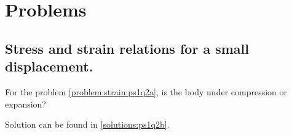 % 
% 
% 
% 
% 
% 
% 
% 
% 
% 
% 
% 
\section{Problems}

\label{problem:strain:ps1q2b}
\subsection{Stress and strain relations for a small displacement.}

For the problem \ref{problem:strain:ps1q2a}, is the body under compression or expansion?

Solution can be found in \ref{solutions:ps1q2b}.
